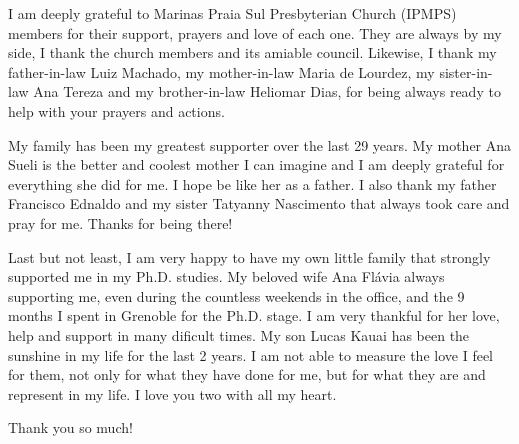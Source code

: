 {	I am deeply grateful to Marinas Praia Sul Presbyterian Church (IPMPS) members
	for their support, prayers and love of each one. They are always by my
	side, I thank the church members and its amiable council. Likewise, I
	thank my father-in-law Luiz Machado, my mother-in-law Maria de Lourdez, my sister-in-law Ana Tereza and my brother-in-law Heliomar
	Dias, for being always ready to help with your prayers and actions. 

	My family has been my greatest supporter over the last 29 years. My mother Ana
	Sueli is the better and coolest mother I can imagine and I am deeply grateful
	for everything she did for me. I hope be like her as a father. I also thank my
	father Francisco Ednaldo and my sister Tatyanny Nascimento that always took
	care and pray for me. Thanks for being there!
	
	Last but not least, I am very happy to have my own little family that strongly
	supported me in my Ph.D. studies. My beloved wife Ana Fl\'avia always
	supporting me, even during the countless weekends in the office, and the 9
	months I spent in Grenoble for the Ph.D. stage. I am very thankful for her
	love, help and support in many dificult times. My son Lucas Kauai has been the
	sunshine in my life for the last 2 years. I am not able to measure the love I
	feel for them, not only for what they have done for me, but for what they are
	and represent in my life. I love you two with all my heart.
	
	Thank you so much!  
	
 

	 
	}

